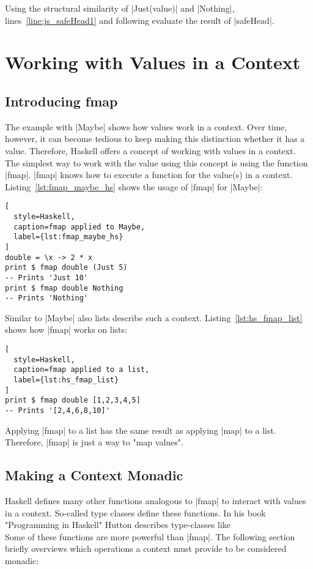 Using the structural similarity of |Just(value)| and |Nothing|,
lines~\ref{line:js_safeHead1} and following evaluate the result of |safeHead|.

\section{Working with Values in a Context} %
\label{sec:Working with values in a context}
\subsection{Introducing fmap} %
\label{sub:Introducing fmap}
The example with |Maybe| shows how values work in a context. Over time,
however, it can become tedious to keep making this distinction whether
it has a value. Therefore, Haskell offers a concept of working with values in a
context. The simplest way to work with the value using this concept is using
the function |fmap|. |fmap| knows how to execute a function for the value(s) in
a context. Listing~\ref{lst:fmap_maybe_hs} shows the usage of |fmap| for
|Maybe|:

\begin{lstlisting}[
  style=Haskell,
  caption=fmap applied to Maybe,
  label={lst:fmap_maybe_hs}
]
double = \x -> 2 * x
print $ fmap double (Just 5)
-- Prints 'Just 10' 
print $ fmap double Nothing
-- Prints 'Nothing'
\end{lstlisting}

Similar to |Maybe| also lists describe such a context.
Listing~\ref{lst:hs_fmap_list} shows how |fmap| works on lists:

\begin{lstlisting}[
  style=Haskell,
  caption=fmap applied to a list,
  label={lst:hs_fmap_list}
]
print $ fmap double [1,2,3,4,5]
-- Prints '[2,4,6,8,10]'
\end{lstlisting}

Applying |fmap| to a list has the same result as applying |map| to a list.
Therefore, |fmap| is just a way to "map values".

\subsection{Making a Context Monadic} %
\label{sub:Making a Context Monadic}
Haskell defines many other functions analogous to |fmap| to interact with
values in a context. So-called type classes define these functions. In his book
"Programming in Haskell" Hutton describes type-classes like
\\ 
Some of these functions are more powerful than |fmap|. The following section
briefly overviews which operations a context must provide to be considered
monadic:


